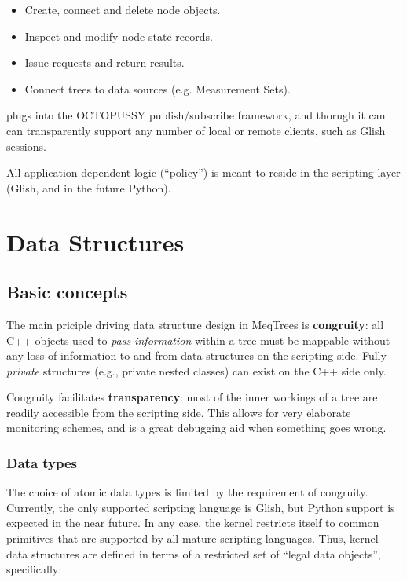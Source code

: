   \begin{itemize}

  \item Create, connect and delete node objects.

  \item Inspect and modify node state records.

  \item Issue requests and return results.

  \item Connect trees to data sources (e.g. Measurement Sets).

  \end{itemize}

   plugs into the OCTOPUSSY publish/subscribe framework, and
  thorugh it can can transparently support any number of local or remote clients,
  such as Glish sessions.

  All application-dependent logic (``policy'') is meant to reside in the scripting
  layer (Glish, and in the future Python).

\chapter{Data Structures} 

\section{Basic concepts}

  The main priciple driving data structure design in MeqTrees is {\bf
  congruity}: all C++ objects used to {\em pass information} within a tree must
  be mappable without any loss of information to and from data structures on
  the scripting side. Fully {\em private} structures (e.g., private nested
  classes) can exist on the C++ side only.

  Congruity facilitates {\bf transparency}: most of the inner workings of a
  tree are readily accessible from the scripting side. This allows for very
  elaborate monitoring schemes, and is a great debugging aid when something
  goes wrong.

\subsection{Data types}
  
  The choice of atomic data types is limited by the requirement of congruity.
  Currently, the only supported scripting language is Glish, but Python 
  support is expected in the near future. In any case, the kernel  restricts
  itself to common primitives that are supported by all mature scripting
  languages. Thus, kernel data structures are defined in terms of a restricted
  set of ``legal data objects'', specifically:

